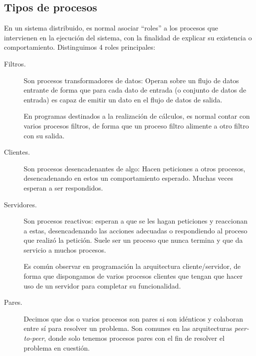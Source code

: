 \subsection{Tipos de procesos}
En un sistema distribuido, es normal asociar ``roles'' a los procesos que intervienen en la ejecución del sistema, con la finalidad de explicar su existencia o comportamiento. Distinguimos 4 roles principales:
\begin{description}
    \item [Filtros.] Son procesos transformadores de datos: Operan sobre un flujo de datos entrante de forma que para cada dato de entrada (o conjunto de datos de entrada) es capaz de emitir un dato en el flujo de datos de salida.

        En programas destinados a la realización de cálculos, es normal contar con varios procesos filtros, de forma que un proceso filtro alimente a otro filtro con su salida.
    \item [Clientes.] Son procesos desencadenantes de algo: Hacen peticiones a otros procesos, desencadenando en estos un comportamiento esperado. Muchas veces esperan a ser respondidos.
    \item [Servidores.] Son procesos reactivos: esperan a que se les hagan peticiones y reaccionan a estas, desencadenando las acciones adecuadas o respondiendo al proceso que realizó la petición. Suele ser un proceso que nunca termina y que da servicio a muchos procesos.

        Es común observar en programación la arquitectura cliente/servidor, de forma que dispongamos de varios procesos clientes que tengan que hacer uso de un servidor para completar su funcionalidad.
    \item [Pares.] Decimos que dos o varios procesos son pares si son idénticos y colaboran entre sí para resolver un problema. Son comunes en las arquitecturas \textit{peer-to-peer}, donde solo tenemos procesos pares con el fin de resolver el problema en cuestión.
\end{description}

